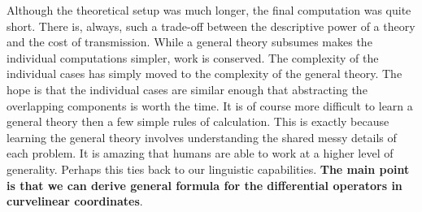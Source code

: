 \documentclass[12pt,letterpaper,boxed]{jhwhw}
\begin{document}
Although the theoretical setup was much longer, the final computation was quite short. There is, always, such a trade-off between the descriptive power of a theory and the cost of transmission. While a general theory subsumes makes the individual computations simpler, work is conserved. The complexity of the individual cases has simply moved to the complexity of the general theory. The hope is that the individual cases are similar enough that abstracting the overlapping components is worth the time. It is of course more difficult to learn a general theory then a few simple rules of calculation. This is exactly because learning the general theory involves understanding the shared messy details of each problem. It is amazing that humans are able to work at a higher level of generality. Perhaps this ties back to our linguistic capabilities. \textbf{The main point is that we can derive general formula for the differential operators in curvelinear coordinates}. 
\end{document}
